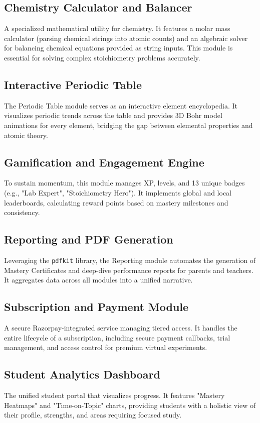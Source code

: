 \documentclass[10pt, conference]{IEEEtran}
\begin{document}
\subsection{Chemistry Calculator and Balancer}
A specialized mathematical utility for chemistry. It features a molar mass calculator (parsing chemical strings into atomic counts) and an algebraic solver for balancing chemical equations provided as string inputs. This module is essential for solving complex stoichiometry problems accurately.

\subsection{Interactive Periodic Table}
The Periodic Table module serves as an interactive element encyclopedia. It visualizes periodic trends across the table and provides 3D Bohr model animations for every element, bridging the gap between elemental properties and atomic theory.

\subsection{Gamification and Engagement Engine}
To sustain momentum, this module manages XP, levels, and 13 unique badges (e.g., "Lab Expert", "Stoichiometry Hero"). It implements global and local leaderboards, calculating reward points based on mastery milestones and consistency.

\subsection{Reporting and PDF Generation}
Leveraging the \texttt{pdfkit} library, the Reporting module automates the generation of Mastery Certificates and deep-dive performance reports for parents and teachers. It aggregates data across all modules into a unified narrative.

\subsection{Subscription and Payment Module}
A secure Razorpay-integrated service managing tiered access. It handles the entire lifecycle of a subscription, including secure payment callbacks, trial management, and access control for premium virtual experiments.

\subsection{Student Analytics Dashboard}
The unified student portal that visualizes progress. It features "Mastery Heatmaps" and "Time-on-Topic" charts, providing students with a holistic view of their profile, strengths, and areas requiring focused study.
\end{document}

